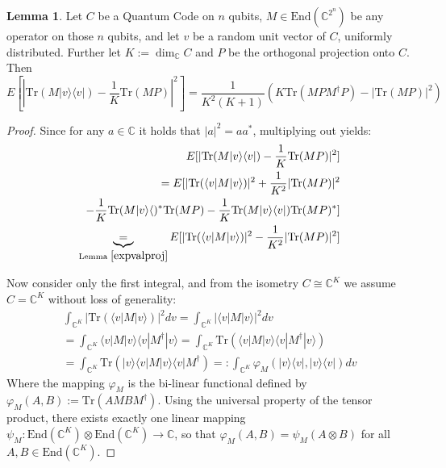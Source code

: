 \documentclass[12pt,a4paper,BCOR15mm,twoside,DIV12]{article}
\def\C{\mathbb{C}}
\def\End{\text{End}}
\def\Tr{\text{Tr}}
\theoremstyle{definition}
\newtheorem{lem}[Satz]{Lemma}
\begin{document}
\begin{lem}\label{expvalvec}
Let $C$ be a Quantum Code on $n$ qubits, $M \in \End(\C^{2^n})$ be any operator on those $n$ qubits, and let $v$ be a random unit vector of $C$, uniformly distributed. Further let $K:= \dim_\C C$ and $P$ be the orthogonal projection onto $C$. Then
\begin{equation} E[|\Tr(M|v\rangle \langle v|) - \frac{1}{K}\Tr(MP)|^2] = \frac{1}{K^2(K+1)}(K \Tr(MPM^\dagger P) - |\Tr(MP)|^2) \end{equation}
\begin{proof}
Since for any $a \in \C$ it holds that $|a|^2 = a a^*$, multiplying out yields:
\begin{align*}
E[|\Tr(M|v\rangle \langle v|) - \frac{1}{K}\Tr(MP)|^2] \\ = E[ |\Tr(\langle v | M | v \rangle )|^2 + \frac{1}{K^2} | \Tr(MP)|^2 \\ - \frac{1}{K} \Tr(M |v \rangle \langle)^* \Tr(MP) - \frac{1}{K} \Tr(M |v\rangle \langle v|) \Tr(MP)^*] \\
 \underbrace{=}_{\text{Lemma }\ref{expvalproj}} E[|\Tr( \langle v|M|v\rangle)|^2 - \frac{1}{K^2}|\Tr(MP)|^2]
\end{align*}

Now consider only the first integral, and from the isometry $C \cong \C^K$ we assume $C = \C^K$ without loss of generality: 
\begin{align*}
\int_{\C^K} |\Tr( \langle v|M|v\rangle)|^2 dv = \int_{\C^K} |\langle v|M|v\rangle|^2 dv \\ =  \int_{\C^K} \langle v|M|v\rangle  \langle v|M^\dagger |v\rangle 
 =  \int_{\C^K} \Tr (\langle v|M|v\rangle  \langle v|M^\dagger |v\rangle ) \\ =  \int_{\C^K} \Tr(|v \rangle \langle v|M|v\rangle  \langle v|M^\dagger) =: \int_{\C^K} \varphi_M(|v \rangle \langle v|,|v \rangle \langle v|) dv
\end{align*}
Where the mapping $\varphi_M$ is the bi-linear functional defined by $\varphi_M(A,B):= \Tr(AMBM^\dagger)$. Using the universal property of the tensor product, there exists exactly one linear mapping $\psi_M: \End(\C^K) \otimes \End(\C^K) \rightarrow \C$, so that
$\varphi_M(A,B) = \psi_M(A \otimes B)$ for all $A, B \in \End(\C^K)$.


\end{proof}
\end{lem}
\end{document}
